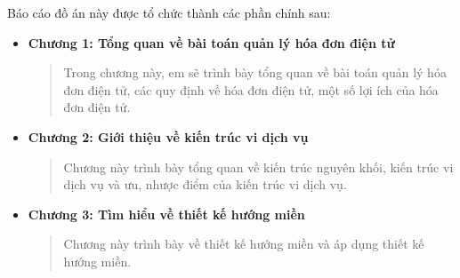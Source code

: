 Báo cáo đồ án này được tổ chức thành các phần chính sau:



\begin{itemize}

    \item \textbf{Chương 1: Tổng quan về bài toán quản lý hóa đơn điện tử}

          \begin{quote}

              Trong chương này, em sẽ trình bày tổng quan về bài toán quản lý hóa đơn điện tử, các quy định về hóa đơn điện tử, một số lợi ích của hóa đơn điện tử.

          \end{quote}

    \item \textbf{Chương 2: Giới thiệu về kiến trúc vi dịch vụ}

          \begin{quote}

              Chương này trình bày tổng quan về kiến trúc nguyên khối,  kiến trúc vi dịch vụ và ưu, nhược điểm của kiến trúc vi dịch vụ.

          \end{quote}

    \item \textbf{Chương 3: Tìm hiểu về thiết kế hướng miền}

          \begin{quote}

              Chương này trình bày   về thiết kế hướng miền và  áp dụng thiết kế hướng miền.

          \end{quote}

\end{itemize}












